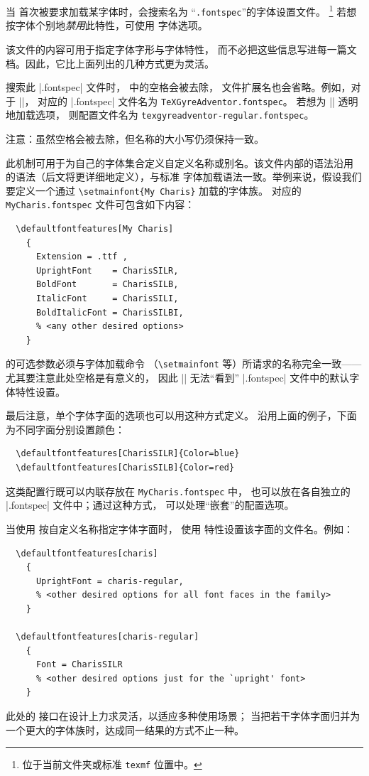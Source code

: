 \documentclass[a4paper]{l3doc}
\begin{document}
当  首次被要求加载某字体时，会搜索名为
“\texttt{.fontspec}”的字体设置文件。%
\footnote{位于当前文件夹或标准 \texttt{texmf} 位置中。}
若想按字体个别地\emph{禁用}此特性，可使用  字体选项。

该文件的内容可用于指定字体字形与字体特性，
而不必把这些信息写进每一篇文档。因此，它比上面列出的几种方式更为灵活。

搜索此 |.fontspec| 文件时， 中的空格会被去除，
文件扩展名也会省略。例如，对于 |\setmainfont{TeX Gyre Adventor}|，
对应的 |.fontspec| 文件名为 \texttt{TeXGyreAdventor.fontspec}。
若想为 |\setmainfont{texgyreadventor-regular.otf}| 透明地加载选项，
则配置文件名为 \texttt{texgyreadventor-regular.fontspec}。

注意：虽然空格会被去除，但名称的大小写仍须保持一致。

此机制可用于为自己的字体集合定义自定义名称或别名。该文件内部的语法沿用
 的语法（后文将更详细地定义），与标准
 字体加载语法一致。举例来说，假设我们要定义一个通过
\verb|\setmainfont{My Charis}| 加载的字体族。
对应的 \texttt{MyCharis.fontspec} 文件可包含如下内容：
\begin{Verbatim}
  \defaultfontfeatures[My Charis]
    {
      Extension = .ttf ,
      UprightFont    = CharisSILR,
      BoldFont       = CharisSILB,
      ItalicFont     = CharisSILI,
      BoldItalicFont = CharisSILBI,
      % <any other desired options>
    }
\end{Verbatim}
 的可选参数必须与字体加载命令
（\verb|\setmainfont| 等）所请求的名称完全一致——尤其要注意此处空格是有意义的，
因此 |\setmainfont{MyCharis}| 无法“看到” |.fontspec| 文件中的默认字体特性设置。

最后注意，单个字体字面的选项也可以用这种方式定义。
沿用上面的例子，下面为不同字面分别设置颜色：
\begin{Verbatim}
  \defaultfontfeatures[CharisSILR]{Color=blue}
  \defaultfontfeatures[CharisSILB]{Color=red}
\end{Verbatim}
这类配置行既可以内联存放在 \texttt{MyCharis.fontspec} 中，
也可以放在各自独立的 |.fontspec| 文件中；通过这种方式，
 可以处理“嵌套”的配置选项。

当使用  按自定义名称指定字体字面时，
使用  特性设置该字面的文件名。例如：
\begin{Verbatim}
  \defaultfontfeatures[charis]
    {
      UprightFont = charis-regular,
      % <other desired options for all font faces in the family>
    }

  \defaultfontfeatures[charis-regular]
    {
      Font = CharisSILR
      % <other desired options just for the `upright' font>
    }
\end{Verbatim}
此处的  接口在设计上力求灵活，以适应多种使用场景；
当把若干字体字面归并为一个更大的字体族时，达成同一结果的方式不止一种。
\end{document}
